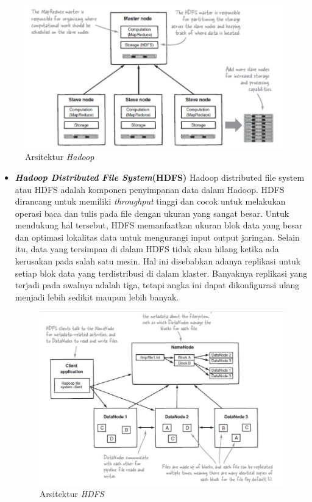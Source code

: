 \documentclass[a4paper,twoside]{article}
\begin{document}
\begin{enumerate}
{		\begin{figure}[H] 
		\centering  
		\includegraphics[scale=0.5]{Arsitektur-Hadoop}  
		\caption[Gambar Arsitektur { \it Hadoop}]{Arsitektur {\it Hadoop}} 
		\label{fig:processing-events relationship} 
		\end{figure}
		\begin{itemize}
		\item[]{\textbf{\textit{Hadoop Distributed File System}(HDFS)}\newline
		Hadoop distributed file system atau HDFS adalah komponen penyimpanan data dalam Hadoop.
		HDFS dirancang untuk memiliki \textit{throughput} tinggi dan cocok untuk melakukan 						operasi baca dan tulis pada file dengan ukuran yang sangat besar. Untuk mendukung hal 					tersebut, HDFS memanfaatkan ukuran blok data yang besar dan optimasi lokalitas data 					untuk mengurangi input output jaringan. Selain itu, data yang tersimpan di dalam HDFS 					tidak akan hilang ketika ada kerusakan pada salah satu mesin. Hal ini disebabkan adanya 				replikasi untuk setiap blok data yang terdistribusi di dalam klaster. Banyaknya 						replikasi yang terjadi pada awalnya adalah tiga, tetapi angka ini dapat dikonfigurasi 					ulang menjadi lebih sedikit maupun lebih banyak.
		
		\begin{figure}[H] 
		\centering  
		\includegraphics[scale=0.5]{HDFS}  
		\caption[Gambar Arsitektur { \it Hadoop}]{Arsitektur {\it HDFS}} 
		\label{fig:processing-events relationship} 
		\end{figure}
	
}
\end{itemize}}
\end{enumerate}
\end{document}
